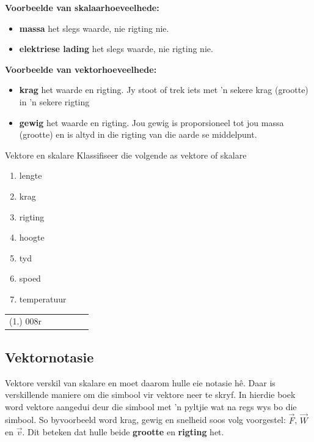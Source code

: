 \textbf{Voorbeelde van skalaarhoeveelhede:}
\begin{itemize}
\item \textbf{massa} het slegs waarde, nie rigting nie.
\item \textbf{elektriese lading} het slegs waarde, nie rigting nie.
\end{itemize}

\textbf{Voorbeelde van vektorhoeveelhede:} 
\begin{itemize}
\item \textbf{krag} het waarde en rigting. Jy stoot of trek iets met  'n sekere krag (grootte) in  'n sekere rigting
\item \textbf{gewig} het waarde en rigting. Jou gewig is proporsioneel tot jou massa (grootte) en is altyd in die rigting van die aarde se middelpunt.
\end{itemize}

\begin{exercises}{Vektore en skalare}\vspace{-1cm}
Klassifiseer die volgende as vektore of skalare
 \begin{enumerate}[noitemsep,label=\textbf{\arabic*}.]
\item lengte
\item krag
\item rigting
\item hoogte
\item tyd
\item spoed
\item temperatuur
 \end{enumerate}
\par \practiceinfo
 \par \begin{tabular}[h]{cccccc}
 (1.) 008r   \end{tabular}
\end{exercises}

    \label{m38812*cid4}
      \label{m38812*uid1}
\subsection*{Vektornotasie}
            \nopagebreak
Vektore verskil van skalare en moet daarom hulle eie notasie hê. Daar is verskillende maniere om die simbool vir vektore neer te skryf. In hierdie boek word vektore aangedui deur die simbool met  'n pyltjie wat na regs wys bo die simbool. So byvoorbeeld word krag, gewig en snelheid soos volg voorgestel: $\stackrel{\to }{F}$, $\stackrel{\to }{W}$ en $\stackrel{\to }{v}$. Dit beteken dat hulle beide \textbf{grootte} en \textbf{rigting} het.

